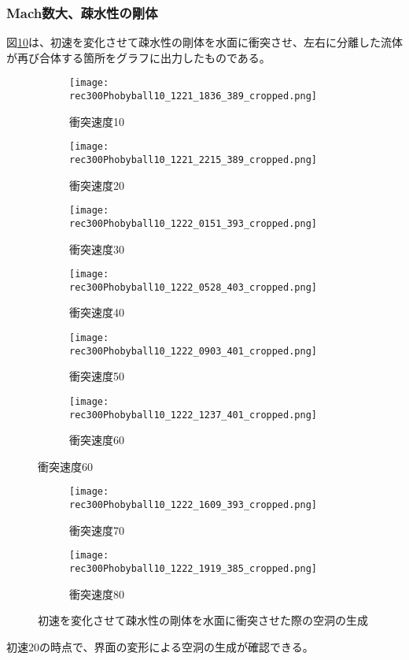 \documentclass[]{jsarticle}
\begin{document}
\subsubsection{Mach数大、疎水性の剛体}
図\ref{fig:MachLPhoby}は、初速を変化させて疎水性の剛体を水面に衝突させ、左右に分離した流体が再び合体する箇所をグラフに出力したものである。
\begin{figure}[H]
  \centering
\begin{subfigure}{0.3\columnwidth}
  \centering
  \texttt{[image: rec300Phobyball10\_1221\_1836\_389\_cropped.png]}
  \caption{衝突速度10}
  \label{fig:vel10}
\end{subfigure}
\begin{subfigure}{0.3\columnwidth}
  \centering
  \texttt{[image: rec300Phobyball10\_1221\_2215\_389\_cropped.png]}
  \caption{衝突速度20}
  \label{fig:vel20}
\end{subfigure}
\begin{subfigure}{0.3\columnwidth}
  \centering
  \texttt{[image: rec300Phobyball10\_1222\_0151\_393\_cropped.png]}
  \caption{衝突速度30}
  \label{fig:vel30}
\end{subfigure}
\begin{subfigure}{0.3\columnwidth}
  \centering
  \texttt{[image: rec300Phobyball10\_1222\_0528\_403\_cropped.png]}
  \caption{衝突速度40}
  \label{fig:vel40}
\end{subfigure}
\begin{subfigure}{0.3\columnwidth}
  \centering
  \texttt{[image: rec300Phobyball10\_1222\_0903\_401\_cropped.png]}
  \caption{衝突速度50}
  \label{fig:vel50}
\end{subfigure}
\begin{subfigure}{0.3\columnwidth}
  \centering
  \texttt{[image: rec300Phobyball10\_1222\_1237\_401\_cropped.png]}
  \caption{衝突速度60}
  \label{fig:vel60}
\end{subfigure}
\end{figure}

\clearpage
\begin{figure}
\ContinuedFloat
  \begin{subfigure}{0.3\columnwidth}
  \centering
  \texttt{[image: rec300Phobyball10\_1222\_1609\_393\_cropped.png]}
  \caption{衝突速度70}
  \label{fig:vel70}
\end{subfigure}
\begin{subfigure}{0.3\columnwidth}
  \centering
  \texttt{[image: rec300Phobyball10\_1222\_1919\_385\_cropped.png]}
  \caption{衝突速度80}
  \label{fig:vel80}
\end{subfigure}
\caption{初速を変化させて疎水性の剛体を水面に衝突させた際の空洞の生成}
\label{fig:MachLPhoby}
\end{figure}
初速20の時点で、界面の変形による空洞の生成が確認できる。
\end{document}
